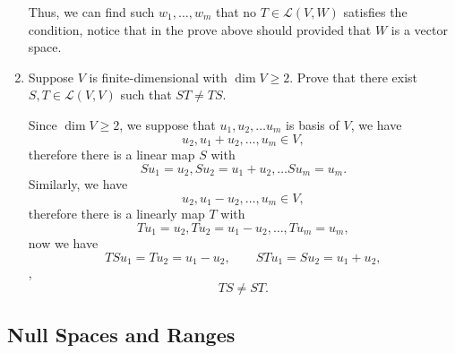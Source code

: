 \begin{enumerate}
\begin{solution}
\begin{itemize}
            \end{itemize}
            Thus, we can find such $w_1,\ldots, w_m$ that no $T \in \mathcal{L}(V,W)$ satisfies the condition, notice that in the prove above should provided that 
            $W$ is a vector space.
        \end{solution}
    \item Suppose $V$ is finite-dimensional with $\dim{V} \geq 2$. Prove that there exist $S, T \in \mathcal{L}(V,V)$ such that $ST \neq TS$.
        \begin{solution}
            Since $\dim{V} \geq 2$, we suppose that $u_1, u_2, \ldots u_m$ is basis of $V$, we have 
            \[ u_2, u_1+u_2, \ldots, u_m \in V,\]
            therefore there is a linear map $S$ with 
            \[ Su_1 = u_2, Su_2 = u_1 + u_2, \ldots Su_m = u_m.\]
            Similarly, we have 
            \[u_2, u_1-u_2, \ldots, u_m \in V,\]
            therefore there is a linearly map $T$ with 
            \[ Tu_1 = u_2, Tu_2 = u_1-u_2,\ldots, Tu_m = u_m,\]
            now we have 
            \[ TSu_1 = Tu_2 = u_1 - u_2, \qquad STu_1 = Su_2 = u_1 + u_2, \]
            \ie, 
            \[ TS \neq ST.\]
        \end{solution}
\end{enumerate}

\subsection{Null Spaces and Ranges}


